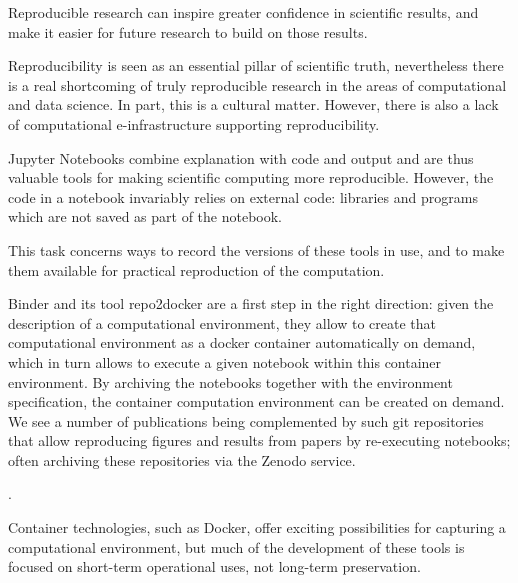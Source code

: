 \begin{task}[
  title=Archiving software environments for reproducible computation,
  id=reproducibility,
  lead=XFEL,
  PM=36,
  wphases={1-36},
  partners={XFEL}
]

  Reproducible research can inspire greater confidence in scientific results,
  and make it easier for future research to build on those results.

  Reproducibility is seen as an essential pillar of scientific truth,
  nevertheless there is a real shortcoming of truly reproducible
  research in the areas of computational and data science. In part,
  this is a cultural matter. However, there is also a lack of
  computational e-infrastructure supporting reproducibility.
  \medskip

  Jupyter Notebooks combine explanation with code and output and are
  thus valuable tools for making scientific computing more
  reproducible. However, the code in a notebook invariably relies on
  external code: libraries and programs which are not saved as part of
  the notebook.

  This task concerns ways to record the versions of these tools in use, and to
  make them available for practical reproduction of the computation.

  Binder and its tool repo2docker are a first step in the right
  direction: given the description of a computational environment,
  they allow to create that computational environment as a docker
  container automatically on demand, which in turn allows to execute a
  given notebook within this container environment. By archiving the
  notebooks together with the environment specification, the container
  computation environment can be created on demand. We see a number of
  publications being complemented by such git repositories that allow
  reproducing figures and results from papers by re-executing
  notebooks; often archiving these repositories via the Zenodo
  service.

  .

  Container technologies, such as Docker, offer exciting possibilities
  for capturing a computational environment, but much of the
  development of these tools is focused on short-term operational
  uses, not long-term preservation.


\end{task}
